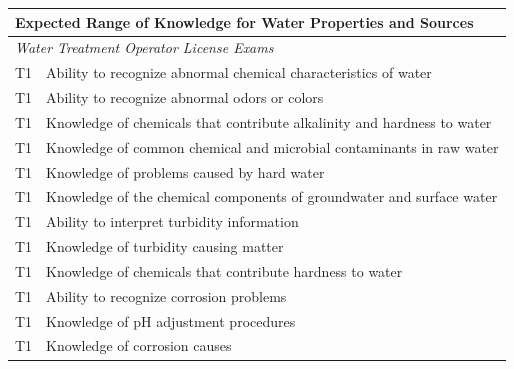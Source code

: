 \begin{table}[H]
\begin{tabular}{| m{1cm} | m{15cm} |}
\end{tabular}
\end{table}


\newpage



\begin{table}[H]
\begin{tabular}{| m{1cm} |m{15cm} |}
\hline
\multicolumn{2}{|l|}{\textbf{Expected   Range of Knowledge for Water Properties and Sources}}                                                                      \\ \hline
\multicolumn{2}{|l|}{\textit{Water   Treatment Operator License Exams}}                                                                  \\ \hline
T1 & Ability to recognize   abnormal chemical characteristics of water                                 \\ \hline
T1 & Ability to recognize   abnormal odors or colors                                                   \\ \hline
T1 & Knowledge of   chemicals that contribute alkalinity and hardness to water                         \\ \hline
T1 & Knowledge of common   chemical and microbial contaminants in raw water                            \\ \hline
T1 & Knowledge of problems   caused by hard water                                                      \\ \hline
T1 & Knowledge of the   chemical components of groundwater and surface water                           \\ \hline
T1 & Ability to interpret   turbidity information                                                      \\ \hline
T1 & Knowledge of   turbidity causing matter                                                           \\ \hline
T1 & Knowledge of   chemicals that contribute hardness to water                                        \\ \hline
T1 & Ability to recognize   corrosion problems                                                         \\ \hline
T1 & Knowledge of pH   adjustment procedures                                                           \\ \hline
T1 & Knowledge of   corrosion causes                                                                   \\ \hline

\end{tabular}
\end{table}
